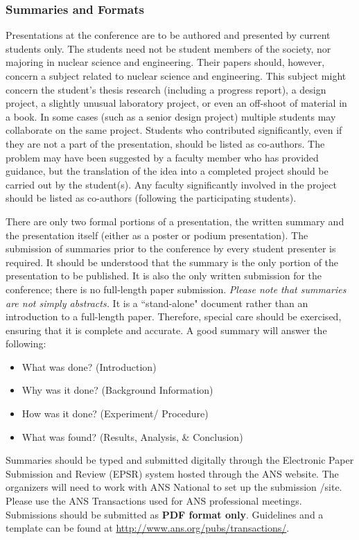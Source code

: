 \documentclass[12pt]{article}
\begin{document}
\subsubsection{Summaries and Formats}
Presentations at the conference are to be authored and presented by current students only.
The students need not be student members of the society, nor majoring in nuclear science and engineering.
Their papers should, however, concern a subject related to nuclear science and engineering.
This subject might concern the student's thesis research (including a progress report), a design project, a slightly unusual laboratory project, or even an off-shoot of material in a book.
In some cases (such as a senior design project) multiple students may collaborate on the same project.
Students who contributed significantly, even if they are not a part of the presentation, should be listed as co-authors.
The problem may have been suggested by a faculty member who has provided guidance, but the translation of the idea into a completed project should be carried out by the student(s).
Any faculty significantly involved in the project should be listed as co-authors (following the participating students).

There are only two formal portions of a presentation, the written summary and the presentation itself (either as a poster or podium presentation).
The submission of summaries prior to the conference by every student presenter is required.
It should be understood that the summary is the only portion of the presentation to be published.
It is also the only written submission for the conference; there is no full-length paper submission.
\emph{Please note that summaries are not simply abstracts.}
It is a ``stand-alone" document rather than an introduction to a full-length paper.
Therefore, special care should be exercised, ensuring that it is complete and accurate.
A good summary will answer the following:

\begin{itemize}
    \item What was done? (Introduction)
    \item Why was it done? (Background Information)
    \item How was it done? (Experiment/ Procedure)
    \item What was found? (Results, Analysis, \& Conclusion)
\end{itemize}

Summaries should be typed and submitted digitally through the Electronic Paper Submission and Review (EPSR) system hosted through the ANS website.
The organizers will need to work with ANS National to set up the submission /site.
Please use the {ANS Transactions} used for ANS professional meetings.
Submissions should be submitted as \textbf{PDF format only}.
Guidelines and a template can be found at \href{http://www.ans.org/pubs/transactions/}{http://www.ans.org/pubs/transactions/}.
\end{document}
